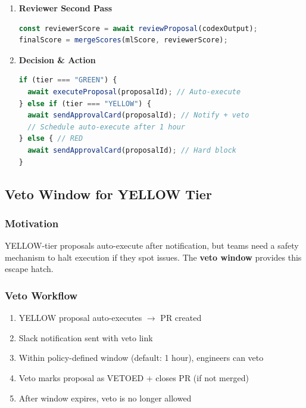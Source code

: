 \documentclass[11pt,a4paper]{article}
\begin{document}
\begin{enumerate}[leftmargin=*]
    \newpage
    \item \textbf{Reviewer Second Pass}
    \begin{lstlisting}[language=JavaScript,caption=Reviewer Agent]
const reviewerScore = await reviewProposal(codexOutput);
finalScore = mergeScores(mlScore, reviewerScore);
    \end{lstlisting}
    
    \item \textbf{Decision \& Action}
    \begin{lstlisting}[language=JavaScript,caption=Tier-Based Routing]
if (tier === "GREEN") {
  await executeProposal(proposalId); // Auto-execute
} else if (tier === "YELLOW") {
  await sendApprovalCard(proposalId); // Notify + veto
  // Schedule auto-execute after 1 hour
} else { // RED
  await sendApprovalCard(proposalId); // Hard block
}
    \end{lstlisting}
\end{enumerate}

\subsection{Veto Window for YELLOW Tier}

\subsubsection{Motivation}
YELLOW-tier proposals auto-execute after notification, but teams need a safety mechanism to halt execution if they spot issues. The \textbf{veto window} provides this escape hatch.

\subsubsection{Veto Workflow}
\begin{enumerate}[leftmargin=*]
    \item YELLOW proposal auto-executes $\rightarrow$ PR created
    \item Slack notification sent with veto link
    \item Within policy-defined window (default: 1 hour), engineers can veto
    \item Veto marks proposal as VETOED + closes PR (if not merged)
    \item After window expires, veto is no longer allowed
\end{enumerate}
\end{document}
